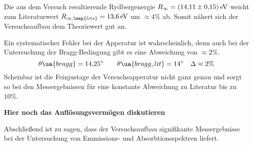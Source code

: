 Die aus dem Versuch resultierende Rydbergenergie $R_\infty=\SI{14.11\pm0.15}{\eV}$ weicht zum Literaturwert \cite{anleitung602}
$R_{\infty,\map{lits}}=\SI{13.6}{\eV}$ um $\approx 4 \%$ ab. Somit nähert sich der
Versuchsaufbau dem Theoriewert gut an.

Ein systematischer Fehler bei der Apperatur ist wahrscheinlich, denn auch bei der
Untersuchung der Bragg-Bedingung gibt es eine Abweichung von $\approx 2\%$.
\begin{equation*}
  \theta\ua{bragg}=\SI{14.25}{\degree}  \qquad \theta\ua{bragg,lit}=\SI{14}{\degree} \quad \Delta\approx2\%
\end{equation*}
Scheinbar ist die Feinjustage der Versuchsapperatur nicht ganz genau und sorgt so bei den Messergebnissen
für eine konstante Abweichung zu Literatur bis zu $10\%$.

\textbf{Hier noch das Auflösungsvermögen diskutieren}

Abschließend ist zu sagen, dass der Versuchsaufbau signifikante Messergebnisse
bei der Untersuchung von Emmissions- und Absorbtionsspektren liefert.
